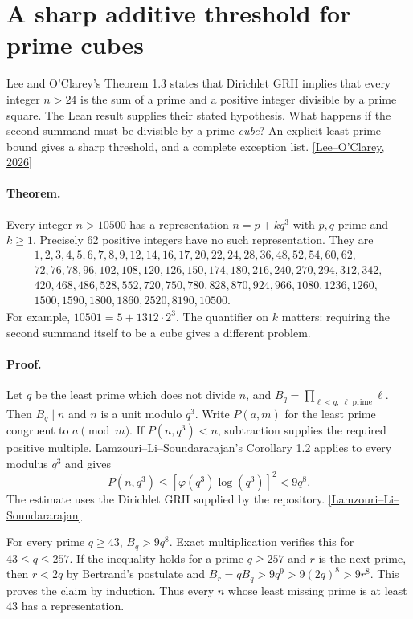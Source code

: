 \section{A sharp additive threshold for prime cubes}
Lee and O'Clarey's Theorem 1.3 states that Dirichlet GRH implies that
every integer $n>24$ is the sum of a prime and a positive integer
divisible by a prime square. The Lean result supplies their stated
hypothesis. What happens if the second summand must be divisible by a
prime \emph{cube}? An explicit least-prime bound gives a sharp
threshold, and a complete exception list.\hfill
\href{https://doi.org/10.1007/s00013-026-02275-6}{[Lee--O'Clarey, 2026]}

\paragraph{Theorem.} Every integer $n>10500$ has a representation
$n=p+kq^3$ with $p,q$ prime and $k\ge1$. Precisely 62 positive integers
have no such representation. They are
\[
\begin{gathered}
1,2,3,4,5,6,7,8,9,12,14,16,17,20,22,24,28,36,48,52,54,60,62,\\
72,76,78,96,102,108,120,126,150,174,180,216,240,270,294,312,342,\\
420,468,486,528,552,720,750,780,828,870,924,966,1080,1236,1260,\\
1500,1590,1800,1860,2520,8190,10500 .
\end{gathered}
\]
For example, $10501=5+1312\cdot 2^3$. The quantifier on $k$ matters:
requiring the second summand itself to be a cube gives a different problem.

\paragraph{Proof.}
Let $q$ be the least prime which does not divide $n$, and
$B_q=\prod_{\ell<q,\ \ell\text{ prime}}\ell$. Then $B_q\mid n$ and
$n$ is a unit modulo $q^3$. Write $P(a,m)$ for the least prime
congruent to $a\pmod m$. If $P(n,q^3)<n$, subtraction supplies the
required positive multiple. Lamzouri--Li--Soundararajan's Corollary 1.2
applies to every modulus $q^3$ and gives
\[
 P(n,q^3)\le [\varphi(q^3)\log(q^3)]^2<9q^8 .
\]
The estimate uses the Dirichlet GRH supplied by the repository.
\hfill\href{https://arxiv.org/pdf/1309.3595}{[Lamzouri--Li--Soundararajan]}

For every prime $q\ge43$, $B_q>9q^8$. Exact multiplication verifies
this for $43\le q\le257$. If the inequality holds for a prime $q\ge257$
and $r$ is the next prime, then $r<2q$ by Bertrand's postulate and
$B_r=qB_q>9q^9>9(2q)^8>9r^8$. This proves the claim by induction.
Thus every $n$ whose least missing prime is at least 43 has a representation.

